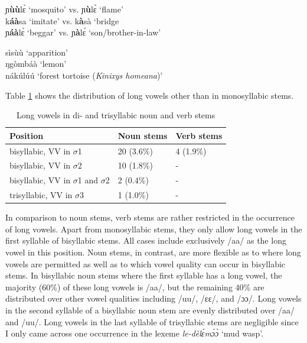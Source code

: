 \begin{exe} \ex \label{LongV2}
ɲ{\bfseries ùù}lɛ̀ `mosquito' vs. ɲ{\bfseries ù}lɛ̀ `flame' \\
k{\bfseries áà}sa `imitate' vs. k{\bfseries à}sà `bridge \\
ɲ{\bfseries áà}lɛ̀ `beggar' vs. ɲ{\bfseries à}lɛ́ `son/brother-in-law'
\end{exe}

\begin{exe} \ex \label{LongV3}
sìsùù `apparition' \\
ŋgòmbáà `lemon' \\
nákúlúú `forest tortoise ({\itshape Kinixys homeana})'
\end{exe}

 \noindent Table \ref{Tab:VLength2} shows the distribution of long vowels other than in monosyllabic stems. 

\begin{table} 
\centering
\begin{tabular}{l|ll}
Position & 	Noun stems & Verb stems \\  \midrule
bisyllabic, VV in $\sigma$1 & 20 (3.6\%) & 4 (1.9\%)\\
bisyllabic, VV in $\sigma$2 & 10 (1.8\%) & - \\
bisyllabic, VV in $\sigma$1 and $\sigma$2 & 2 (0.4\%) & - \\
trisyllabic, VV in $\sigma$3 & 1 (1.0\%) & - \\
\end{tabular}
\caption{Long vowels in di- and trisyllabic noun and verb stems}
\label{Tab:VLength2}
\end{table}

In comparison to noun stems, verb stems are rather restricted in the occurrence of long vowels. Apart from monosyllabic stems, they only allow long vowels in the first syllable of bisyllabic stems. All cases include exclusively /aa/ as the long vowel in this position. Noun stems, in contrast, are more flexible as to where long vowels are permitted as well as to which vowel quality can occur in bisyllabic stems. In bisyllabic noun stems where the first syllable has a long vowel, the majority (60\%) of these long vowels is /aa/, but the remaining 40\% are distributed over other vowel qualities including /uu/, /ɛɛ/, and /ɔɔ/. Long vowels in the second syllable of a bisyllabic noun stem are evenly distributed over /aa/ and /uu/. Long vowels in the last syllable of trisyllabic stems are negligible since I only came across one occurrence in the lexeme {\itshape le-dèlɛ́mɔ́ɔ̀} `mud wasp'.

